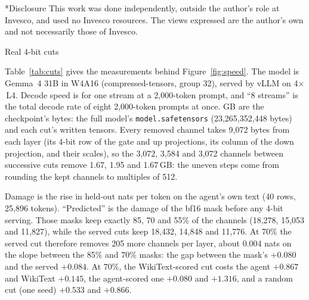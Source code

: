 \documentclass[10pt,twocolumn]{article}
\makeatletter
\newcommand{\code}[1]{\texttt{\small #1}}
\newcommand{\X}{\ensuremath{\times}}
\renewcommand\section{\@startsection{section}{1}{\z@}{-2.2ex \@plus -.6ex \@minus -.2ex}{1.1ex \@plus .2ex}%
  {\normalfont\large\bfseries}}
\makeatother
\begin{document}
\section*{Disclosure}
This work was done independently, outside the author's role at Invesco, and used no Invesco resources. The views
expressed are the author's own and not necessarily those of Invesco.




\appendix

\section{Real 4-bit cuts}\label{app:cuts}

Table~\ref{tab:cuts} gives the measurements behind Figure~\ref{fig:speed}. The model is Gemma~4 31B in W4A16
(compressed-tensors, group 32), served by vLLM on 4\X\,L4. Decode speed is for one stream at a 2,000-token prompt, and
``8 streams'' is the total decode rate of eight 2,000-token prompts at once. GB are the checkpoint's bytes: the full
model's \code{model.safetensors} (23,265,352,448 bytes) and each cut's written tensors. Every removed channel takes
9,072 bytes from each layer (its 4-bit row of the gate and up projections, its column of the down projection, and their
scales), so the 3,072, 3,584 and 3,072 channels between successive cuts remove 1.67, 1.95 and 1.67\,GB: the uneven
steps come from rounding the kept channels to multiples of 512.

Damage is the rise in held-out nats per token on the agent's own text (40 rows, 25,896 tokens). ``Predicted'' is the
damage of the bf16 mask before any 4-bit serving. Those masks keep exactly 85, 70 and 55\% of the channels (18,278,
15,053 and 11,827), while the served cuts keep 18,432, 14,848 and 11,776. At 70\% the served cut therefore removes 205
more channels per layer, about 0.004 nats on the slope between the 85\% and 70\% masks: the gap between the mask's
$+0.080$ and the served $+0.084$. At 70\%, the WikiText-scored cut costs the agent $+0.867$ and WikiText $+0.145$, the
agent-scored one $+0.080$ and $+1.316$, and a random cut (one seed) $+0.533$ and $+0.866$.
\end{document}
